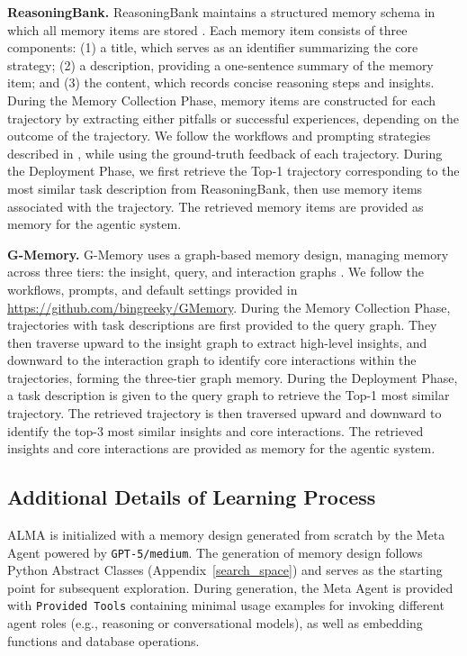 \documentclass{article}
\theoremstyle{plain}
\theoremstyle{definition}
\theoremstyle{remark}
\newcommand{\ouralgo}{ALMA\xspace} %
\begin{document}
\noindent\textbf{ReasoningBank.}\hspace{0.5em} 
ReasoningBank maintains a structured memory schema in which all memory items are stored \citep{ouyang2025reasoningbank}.
Each memory item consists of three components:
(1) a title, which serves as an identifier summarizing the core strategy;
(2) a description, providing a one-sentence summary of the memory item; and
(3) the content, which records concise reasoning steps and insights.
During the Memory Collection Phase, memory items are constructed for each trajectory
by extracting either pitfalls or successful experiences, depending on the outcome
of the trajectory.
We follow the workflows and prompting strategies described in \citet{ouyang2025reasoningbank},
while using the ground-truth feedback of each trajectory.
During the Deployment Phase, we first retrieve the Top-1 trajectory corresponding
to the most similar task description from ReasoningBank, then use memory items
associated with the trajectory. The retrieved memory items are provided as memory for the agentic system.

\noindent\textbf{G-Memory.}\hspace{0.5em}
G-Memory uses a graph-based memory design, managing memory across three tiers: 
the insight, query, and interaction graphs \citep{zhang2025g}. 
We follow the workflows, prompts, and default settings provided in 
\url{https://github.com/bingreeky/GMemory}.
During the Memory Collection Phase, trajectories with task descriptions are first
provided to the query graph. They then traverse upward to the insight graph to
extract high-level insights, and downward to the interaction graph to identify
core interactions within the trajectories, forming the three-tier graph memory.
During the Deployment Phase, a task description is given to the query graph to
retrieve the Top-1 most similar trajectory. The retrieved trajectory is then
traversed upward and downward to identify the top-3 most similar insights and
core interactions. The retrieved insights and core interactions are provided as memory for the agentic system.

\subsection{Additional Details of Learning Process}
\label{app:learning_process}
\ouralgo is initialized with a memory design generated from scratch by the Meta Agent powered by \texttt{GPT-5/medium}. The generation of memory design follows Python Abstract Classes (Appendix~\ref{search_space}) and serves 
as the starting point for subsequent exploration. During generation, the Meta Agent 
is provided with \texttt{Provided Tools} containing minimal usage examples for 
invoking different agent roles (e.g., reasoning or conversational models), as well as 
embedding functions and database operations.
\end{document}
